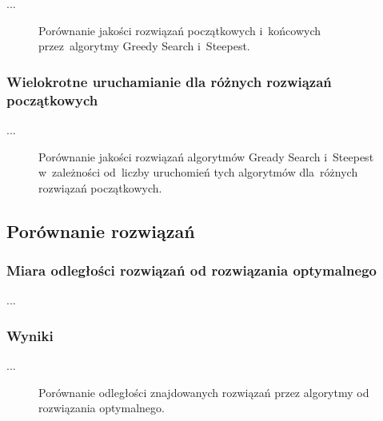...

\begin{figure}
\begin{center}
\end{center}
\caption{Porównanie jakości rozwiązań początkowych i~końcowych przez~algorytmy Greedy Search i~Steepest.}
\label{fig:diff}
\end{figure}

\subsubsection{Wielokrotne uruchamianie dla różnych rozwiązań początkowych}

...

\begin{figure}
\begin{center}
\end{center}
\caption{Porównanie jakości rozwiązań algorytmów Gready Search i~Steepest w~zależności od~liczby uruchomień tych algorytmów dla~różnych rozwiązań początkowych.}
\label{fig:more}
\end{figure}

\subsection{Porównanie rozwiązań}

\subsubsection{Miara odległości rozwiązań od rozwiązania optymalnego}

...

\subsubsection{Wyniki}

...

\begin{figure}
\begin{center}
\end{center}
\caption{Porównanie odległości znajdowanych rozwiązań przez algorytmy od rozwiązania optymalnego.}
\label{fig:dist}
\end{figure}